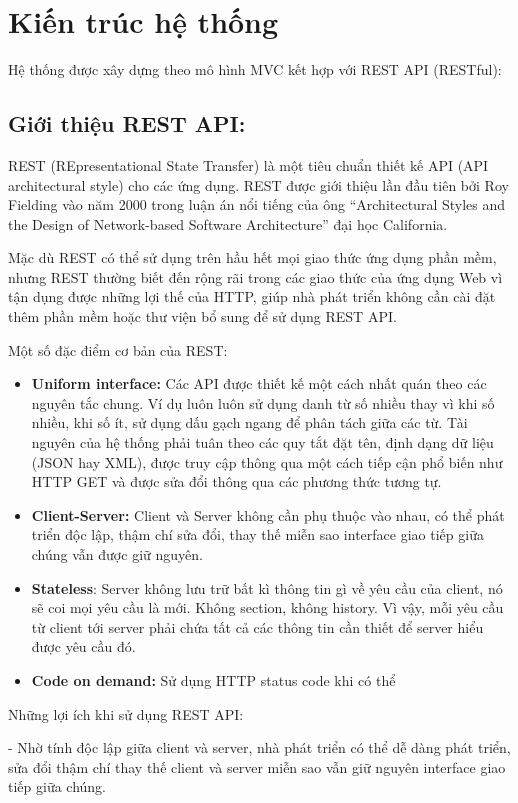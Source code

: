 \section{Kiến trúc hệ thống}
\indent Hệ thống được xây dựng theo mô hình MVC kết hợp với REST API (RESTful):
\subsection{Giới thiệu REST API:}
REST (REpresentational State Transfer) là một tiêu chuẩn thiết kế API (API architectural style) cho các ứng dụng. REST được giới thiệu lần đầu tiên bởi Roy Fielding vào năm 2000 trong luận án nổi tiếng của ông ``Architectural Styles and
the Design of Network-based Software Architecture'' đại học California.

Mặc dù REST có thể sử dụng trên hầu hết mọi giao thức ứng dụng phần mềm, nhưng REST thường biết đến rộng rãi trong các giao thức của ứng dụng Web vì tận dụng được những lợi thế của HTTP, giúp nhà phát triển không cần cài đặt thêm phần mềm hoặc thư viện bổ sung để sử dụng REST API.

Một số đặc điểm cơ bản của REST:
\begin{itemize}
    \item \textbf{Uniform interface:} Các API được thiết kế một cách nhất quán theo các nguyên tắc chung. Ví dụ luôn luôn sử dụng danh từ số nhiều thay vì khi số nhiều, khi số ít, sử dụng dấu gạch ngang để phân tách giữa các từ. Tài nguyên của hệ thống phải tuân theo các quy tắt đặt tên, định dạng dữ liệu (JSON hay XML), được truy cập thông qua một cách tiếp cận phổ biến như HTTP GET và được sửa đổi thông qua các phương thức tương tự.
    \item \textbf{Client-Server:} Client và Server không cần phụ thuộc vào nhau, có thể phát triển độc lập, thậm chí sửa đổi, thay thế miễn sao interface giao tiếp giữa chúng vẫn được giữ nguyên.
    \item \textbf{Stateless}: Server không lưu trữ bất kì thông tin gì về yêu cầu của client, nó sẽ coi mọi yêu cầu là mới. Không section, không history. Vì vậy, mỗi yêu cầu từ client tới server phải chứa tất cả các thông tin cần thiết để  server hiểu được yêu cầu đó.
    \item \textbf{Code on demand:} Sử dụng HTTP status code khi có thể
\end{itemize}


Những lợi ích khi sử dụng REST API:

- Nhờ tính độc lập giữa client và server, nhà phát triển có thể dễ dàng phát triển, sửa đổi thậm chí thay thế client và server miễn sao vẫn giữ nguyên interface giao tiếp giữa chúng.

